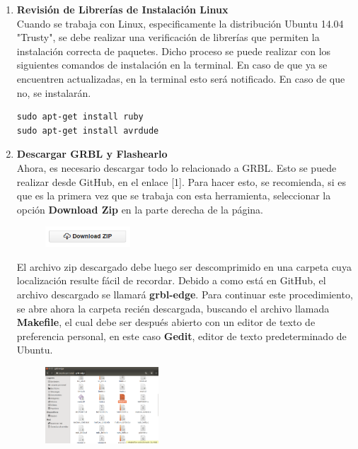 \documentclass{article}
\begin{document}
\begin{multicols}{2}
\begin{enumerate}
\item \textbf{Revisión de Librerías de Instalación Linux}\\
Cuando se trabaja con Linux, especificamente la distribución Ubuntu 14.04 "Trusty", se debe realizar una verificación de librerías que permiten la instalación correcta de paquetes. Dicho proceso se puede realizar con los siguientes comandos de instalación en la terminal. En caso de que ya se encuentren actualizadas, en la terminal esto será notificado. En caso de que no, se instalarán.
\begin{lstlisting}
sudo apt-get install ruby
sudo apt-get install avrdude
\end{lstlisting}

\item \textbf{Descargar GRBL y Flashearlo}\\
Ahora, es necesario descargar todo lo relacionado a GRBL. Esto se puede realizar desde GitHub, en el enlace [1]. Para hacer esto, se recomienda, si es que es la primera vez que se trabaja con esta herramienta, seleccionar la opción \textbf{Download Zip} en la parte derecha de la página.
\begin{figure}[H]
\centering
\includegraphics[width=0.3\textwidth]{BotonDescarga.png}
\label{fig:Boton}
\end{figure}

El archivo zip descargado debe luego ser descomprimido en una carpeta cuya localización resulte fácil de recordar. Debido a como está en GitHub, el archivo descargado se llamará \textbf{grbl-edge}. Para continuar este procedimiento, se abre ahora la carpeta recién descargada, buscando el archivo llamada \textbf{Makefile}, el cual debe ser después abierto con un editor de texto de preferencia personal, en este caso \textbf{Gedit}, editor de texto predeterminado de Ubuntu.

\begin{figure}[H]
\centering
\includegraphics[width=0.4\textwidth]{Carpeta.png}
\label{fig:Carpeta}
\end{figure}


\end{enumerate}
\end{multicols}
\end{document}
